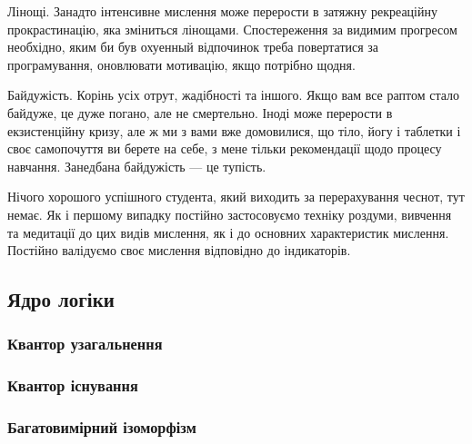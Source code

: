 Лінощі. Занадто інтенсивне мислення може перерости в затяжну
рекреаційну прокрастинацію, яка зміниться лінощами.
Спостереження за видимим прогресом необхідно, яким би був
охуенный відпочинок треба повертатися за програмування,
оновлювати мотивацію, якщо потрібно щодня.

Байдужість. Корінь усіх отрут, жадібності та іншого. Якщо
вам все раптом стало байдуже, це дуже погано, але не смертельно.
Іноді може перерости в екзистенційну кризу, але ж ми з вами вже
домовилися, що тіло, йогу і таблетки і своє самопочуття ви
берете на себе, з мене тільки рекомендації щодо процесу
навчання. Занедбана байдужість --- це тупість.

Нічого хорошого успішного студента, який виходить за
перерахування чеснот, тут немає. Як і першому випадку
постійно застосовуємо техніку роздуми, вивчення та
медитації до цих видів мислення, як і до основних характеристик
мислення. Постійно валідуємо своє мислення відповідно
до індикаторів.

\subsection{Ядро логіки}

\subsubsection{Квантор узагальнення}

\subsubsection{Квантор існування}

\subsubsection{Багатовимірний ізоморфізм}

\normalsize
